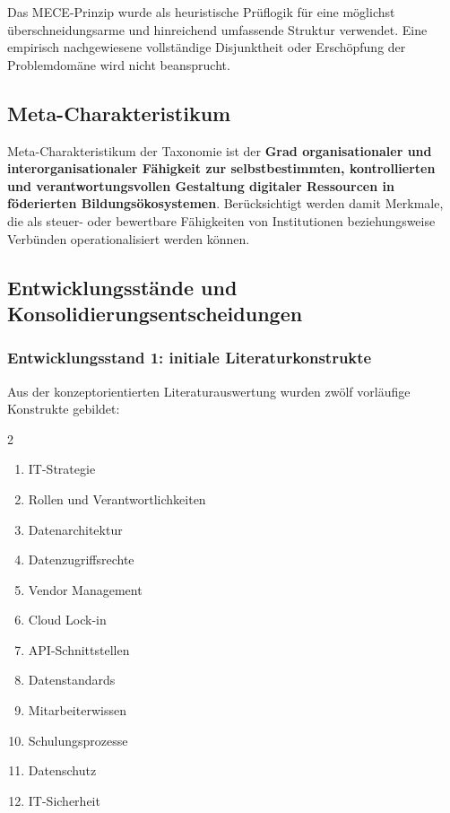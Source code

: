 \documentclass[10pt,a4paper]{article}
\begin{document}
Das MECE-Prinzip wurde als heuristische Prüflogik für eine möglichst überschneidungsarme und hinreichend umfassende Struktur verwendet. Eine empirisch nachgewiesene vollständige Disjunktheit oder Erschöpfung der Problemdomäne wird nicht beansprucht.

\subsection{Meta-Charakteristikum}

Meta-Charakteristikum der Taxonomie ist der \textbf{Grad organisationaler und interorganisationaler Fähigkeit zur selbstbestimmten, kontrollierten und verantwortungsvollen Gestaltung digitaler Ressourcen in föderierten Bildungsökosystemen}. Berücksichtigt werden damit Merkmale, die als steuer- oder bewertbare Fähigkeiten von Institutionen beziehungsweise Verbünden operationalisiert werden können.

\subsection{Entwicklungsstände und Konsolidierungsentscheidungen}

\subsubsection{Entwicklungsstand 1: initiale Literaturkonstrukte}

Aus der konzeptorientierten Literaturauswertung wurden zwölf vorläufige Konstrukte gebildet:

\begin{multicols}{2}
\begin{enumerate}[label=\arabic*.]
  \item IT-Strategie
  \item Rollen und Verantwortlichkeiten
  \item Datenarchitektur
  \item Datenzugriffsrechte
  \item Vendor Management
  \item Cloud Lock-in
  \item API-Schnittstellen
  \item Datenstandards
  \item Mitarbeiterwissen
  \item Schulungsprozesse
  \item Datenschutz
  \item IT-Sicherheit
\end{enumerate}
\end{multicols}
\end{document}
